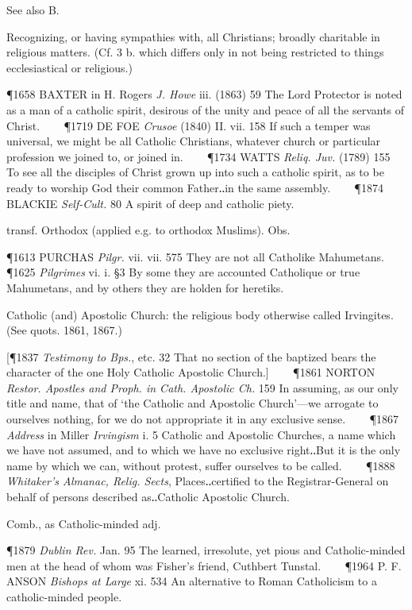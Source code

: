 \begin{description}[wide, labelwidth=!, labelindent=0pt]
\begin{myenumerate}
 See also B.

 Recognizing, or having sympathies with, all Christians; broadly charitable in religious matters. (Cf. 3 b. which differs only in not being restricted to things ecclesiastical or religious.)

\P 1658 BAXTER  in H. Rogers \textit{J. Howe} iii. (1863) 59 The Lord Protector is noted as a man of a catholic spirit, desirous of the unity and peace of all the servants of Christ.    
\P 1719 DE FOE  \textit{Crusoe} (1840) II. vii. 158 If such a temper was universal, we might be all Catholic Christians, whatever church or particular profession we joined to, or joined in.    
\P 1734 WATTS  \textit{Reliq. Juv.} (1789) 155 To see all the disciples of Christ grown up into such a catholic spirit, as to be ready to worship God their common Father‥in the same assembly.    
\P 1874 BLACKIE  \textit{Self-Cult.} 80 A spirit of deep and catholic piety.

 transf. Orthodox (applied e.g. to orthodox Muslims). Obs.

\P 1613 PURCHAS  \textit{Pilgr.} vii. vii. 575 They are not all Catholike Mahumetans.    
\P 1625 \textit{Pilgrimes} vi. i. §3 By some they are accounted Catholique or true Mahumetans, and by others they are holden for heretiks.

 Catholic (and) Apostolic Church: the religious body otherwise called Irvingites. (See quots. 1861, 1867.)

[\P 1837 \textit{Testimony  to Bps.}, etc. 32 That no section of the baptized bears the character of the one Holy Catholic Apostolic Church.]    
\P 1861 NORTON  \textit{Restor. Apostles and Proph. in Cath. Apostolic Ch.} 159 In assuming, as our only title and name, that of ‘the Catholic and Apostolic Church’—we arrogate to ourselves nothing, for we do not appropriate it in any exclusive sense.    
\P 1867 \textit{Address}  in Miller \textit{Irvingism} i. 5 Catholic and Apostolic Churches, a name which we have not assumed, and to which we have no exclusive right‥But it is the only name by which we can, without protest, suffer ourselves to be called.    
\P 1888 \textit{Whitaker's  Almanac, Relig. Sects}, Places‥certified to the Registrar-General on behalf of persons described as‥Catholic Apostolic Church.

 Comb., as Catholic-minded adj.

\P 1879 \textit{Dublin  Rev.} Jan. 95 The learned, irresolute, yet pious and Catholic-minded men at the head of whom was Fisher's friend, Cuthbert Tunstal.    
\P 1964 P. F. ANSON  \textit{Bishops at Large} xi. 534 An alternative to Roman Catholicism to a catholic-minded people.


\end{myenumerate}
\end{description}
